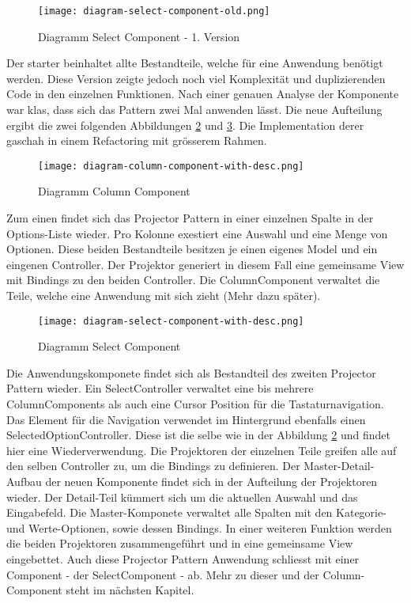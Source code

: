\begin{figure}[!htb]
    \centering
    \texttt{[image: diagram-select-component-old.png]}
    \caption{Diagramm Select Component - 1. Version}
    \label{Abbildung:DiagramSelectComponentOld}
\end{figure}

Der starter beinhaltet allte Bestandteile, welche für eine Anwendung benötigt werden.
Diese Version zeigte jedoch noch viel Komplexität und duplizierenden Code in den einzelnen Funktionen.
Nach einer genauen Analyse der Komponente war klas, dass sich das Pattern zwei Mal anwenden lässt.
Die neue Aufteilung ergibt die zwei folgenden Abbildungen \ref{Abbildung:DiagramColumnComponent} und \ref{Abbildung:DiagramSelectComponent}.
Die Implementation derer gaschah in einem Refactoring mit grösserem Rahmen.

\begin{figure}[!htb]
    \centering
    \texttt{[image: diagram-column-component-with-desc.png]}
    \caption{Diagramm Column Component}
    \label{Abbildung:DiagramColumnComponent}
\end{figure}

Zum einen findet sich das Projector Pattern in einer einzelnen Spalte in der Options-Liste wieder.
Pro Kolonne exestiert eine Auswahl und eine Menge von Optionen.
Diese beiden Bestandteile besitzen je einen eigenes Model und ein eingenen Controller.
Der Projektor generiert in diesem Fall eine gemeinsame View mit Bindings zu den beiden Controller.
Die ColumnComponent verwaltet die Teile, welche eine Anwendung mit sich zieht (Mehr dazu später).

\begin{figure}[!htb]
    \centering
    \texttt{[image: diagram-select-component-with-desc.png]}
    \caption{Diagramm Select Component}
    \label{Abbildung:DiagramSelectComponent}
\end{figure}

Die Anwendungskomponete findet sich als Bestandteil des zweiten Projector Pattern wieder.
Ein SelectController verwaltet eine bis mehrere ColumnComponents als auch eine Cursor Position für die Tastaturnavigation.
Das Element für die Navigation verwendet im Hintergrund ebenfalls einen SelectedOptionController. 
Diese ist die selbe wie in der Abbildung \ref{Abbildung:DiagramColumnComponent} und findet hier eine Wiederverwendung.
Die Projektoren der einzelnen Teile greifen alle auf den selben Controller zu, um die Bindings zu definieren.
Der Master-Detail-Aufbau der neuen Komponente findet sich in der Aufteilung der Projektoren wieder.
Der Detail-Teil kümmert sich um die aktuellen Auswahl und das Eingabefeld.
Die Master-Komponete verwaltet alle Spalten mit den Kategorie- und Werte-Optionen, sowie dessen Bindings.
In einer weiteren Funktion werden die beiden Projektoren zusammengeführt und in eine gemeinsame View eingebettet.
Auch diese Projector Pattern Anwendung schliesst mit einer Component - der SelectComponent - ab.
Mehr zu dieser und der Column-Component steht im nächsten Kapitel.



